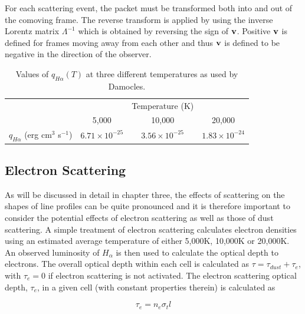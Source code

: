 For each scattering event, the packet must be transformed both into and out of the comoving frame. The reverse transform is applied by using the inverse Lorentz matrix $\Lambda^{-1}$ which is obtained by reversing the sign of $\bf{v}$.  Positive $\bf{v}$ is defined for frames moving away from each other and thus $\bf{v}$ is defined to be negative in the direction of the observer.
	
        	\begin{table}[htdp]
        \caption{Values of $q_{H\alpha}(T)$ at three different temperatures as used by Damocles.}
        \begin{center}
        \def\arraystretch{1.5}
        \begin{tabular}{ c c c c}
        \toprule
&&Temperature (K) & \\
        \cmidrule{2-4}
        & 5,000 & 10,000 & 20,000  \\
        \midrule
        $q_{H\alpha}$ (erg cm$^3$ s$^{-1}$)  & $6.71\times 10^{-25}$	&$3.56\times 10^{-25}$	&$1.83\times 10^{-24}$  \\
        \bottomrule
        \end{tabular}
        \end{center}
        \label{tb:q}
        \end{table}%

	\subsection{Electron Scattering}
	\label{scn:ES}

	As will be discussed in detail in chapter three, the effects of scattering on the shapes of line profiles can be quite pronounced and it is therefore important to consider the potential effects of electron scattering as well as those of dust scattering.  A simple treatment of electron scattering calculates electron densities using an estimated average temperature of either 5,000K, 10,000K or 20,000K.  An observed luminosity of $H_{\alpha}$ is then used to calculate the optical depth to electrons.  The overall optical depth within each cell is calculated as $\tau = \tau_{dust}+\tau_{e}$, with $\tau_{e}=0$ if electron scattering is not activated.  The electron scattering optical depth, $\tau_e$, in a given cell (with constant properties therein) is calculated as 
	
	\begin{equation}
	\tau_e =  n_e \sigma_t l
	\end{equation}
	
